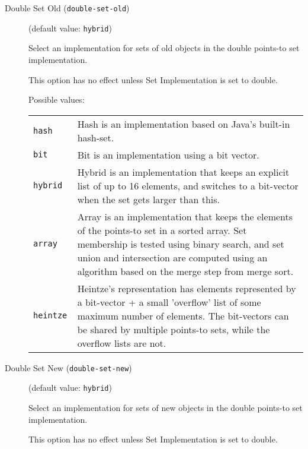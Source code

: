 \documentclass{article}
\begin{document}
\begin{description}
\item[Double Set Old ({\tt double-set-old})]
(default value: {\tt hybrid})




Select an implementation for sets of old objects in the double
points-to set implementation.

This option has no effect unless Set Implementation is set to double.
        



Possible values:\\
\begin{longtable}{p{1in}p{4in}}

{\tt hash }
&

Hash is an implementation based on Java's built-in hash-set.
\\

{\tt bit }
&

Bit is an implementation using a bit vector.
\\

{\tt hybrid }
&

Hybrid is an implementation that keeps an explicit list of up to
16 elements, and switches to a bit-vector when the set gets
larger than this.
\\

{\tt array }
&

Array is an implementation that keeps the elements of the
points-to set in a sorted array. Set membership is tested using
binary search, and set union and intersection are computed using
an algorithm based on the merge step from merge sort.
\\

{\tt heintze }
&
Heintze's representation has elements represented by a bit-vector + a small
									'overflow' list of some maximum number of elements.  The bit-vectors can be shared
									by multiple points-to sets, while the overflow lists are not.
								\\

\end{longtable}


\item[Double Set New ({\tt double-set-new})]
(default value: {\tt hybrid})




Select an implementation for sets of new objects in the double
points-to set implementation.

This option has no effect unless Set Implementation is set to double.
        




\end{description}
\end{document}
